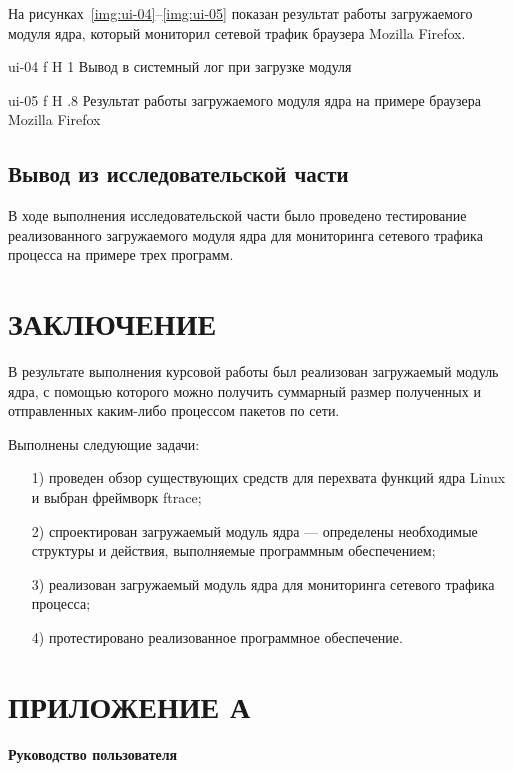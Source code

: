 \documentclass{bmstu}
\begin{document}
На рисунках~\ref{img:ui-04}--\ref{img:ui-05} показан результат работы загружаемого модуля ядра, который мониторил сетевой трафик браузера Mozilla Firefox.

    {ui-04}
    {f}
    {H}
    {1\textwidth}
    {Вывод в системный лог при загрузке модуля}
    
    {ui-05}
    {f}
    {H}
    {.8\textwidth}
    {Результат работы загружаемого модуля ядра на примере браузера Mozilla Firefox}

\section*{Вывод из исследовательской части}

В ходе выполнения исследовательской части было проведено тестирование реализованного загружаемого модуля ядра для мониторинга сетевого трафика процесса на примере трех программ.

{\centering \chapter*{ЗАКЛЮЧЕНИЕ}}

В результате выполнения курсовой работы был реализован загружаемый модуль ядра, с помощью которого можно получить суммарный размер полученных и отправленных каким-либо процессом пакетов по сети.

Выполнены следующие задачи:
\begin{enumerate}
\item[1)] проведен обзор существующих средств для перехвата функций ядра Linux и выбран фреймворк ftrace;
\item[2)] спроектирован загружаемый модуль ядра --- определены необходимые структуры и действия, выполняемые программным обеспечением;
\item[3)] реализован загружаемый модуль ядра для мониторинга сетевого трафика процесса;
\item[4)] протестировано реализованное программное обеспечение.
\end{enumerate}

{\centering \printbibliography[title=СПИСОК ИСПОЛЬЗОВАННЫХ ИСТОЧНИКОВ,heading=bibintoc]}

{\centering \chapter*{ПРИЛОЖЕНИЕ А}}
\begin{center}
\textbf{Руководство пользователя}
\end{center}
\end{document}
